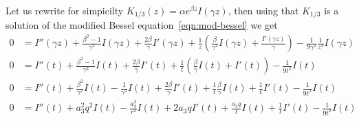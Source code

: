 \documentclass{article}
\theoremstyle{definition}
\theoremstyle{plain}
\newenvironment{verify}{\color{ForestGreen}}{\color{black}}
\begin{document}
\begin{itemize}
\begin{verify}
Let us rewrite for simpicilty $K_{1/3}(z)=\alpha e^{\beta z} I(\gamma z)$, then using that $K_{1/3}$ is a solution of the modified Bessel equation~\eqref{eqn:mod-bessel} we get
\begin{align*}
0 &= I''(\gamma z)+\frac{\beta^2-1}{\gamma^2}I(\gamma z)+\frac{2\beta}{\gamma}I'(\gamma z)+\frac{1}{z}\left(\frac{\beta}{\gamma^2}I(\gamma z)+\frac{I'(\gamma z)}{\gamma}\right)-\frac{1}{9\gamma^2}\frac{1}{z^2} I(\gamma z) \\
0 &= I''(t)+\frac{\beta^2-1}{\gamma^2}I(t)+\frac{2\beta}{\gamma}I'(t)+\frac{1}{t}\left(\frac{\beta}{\gamma}I(t)+I'(t)\right)-\frac{1}{9t^2} I(t)\\
0 &= I''(t)+\frac{\beta^2}{\gamma^2}I(t)-\frac{1}{\gamma^2}I(t)+\frac{2\beta}{\gamma}I'(t)+\frac{1}{t}\frac{\beta}{\gamma}I(t)+\frac{1}{t}I'(t)-\frac{1}{9t^2} I(t)\\
0 &= I''(t)+a_3^2q^2 I(t)-\frac{a_3^2}{r^2}I(t)+2a_3 qI'(t)+\frac{a_3 q}{t}I(t)+\frac{1}{t}I'(t)-\frac{1}{9t^2} I(t)
\end{align*}


\end{verify}
\end{itemize}
\end{document}
